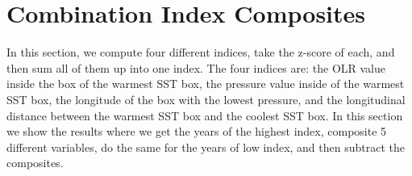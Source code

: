 \documentclass[]{article}
\begin{document}

\section{Combination Index Composites}
In this section, we compute four different indices, take the z-score of each, and then sum all of them up into one index.  The four indices are: the OLR value inside the box of the warmest SST box, the pressure value inside of the warmest SST box, the longitude of the box with the lowest pressure, and the longitudinal distance between the warmest SST box and the coolest SST box.  In this section we show the results where we get the years of the highest index, composite 5 different variables, do the same for the years of low index, and then subtract the composites.
\newpage
\end{document}
